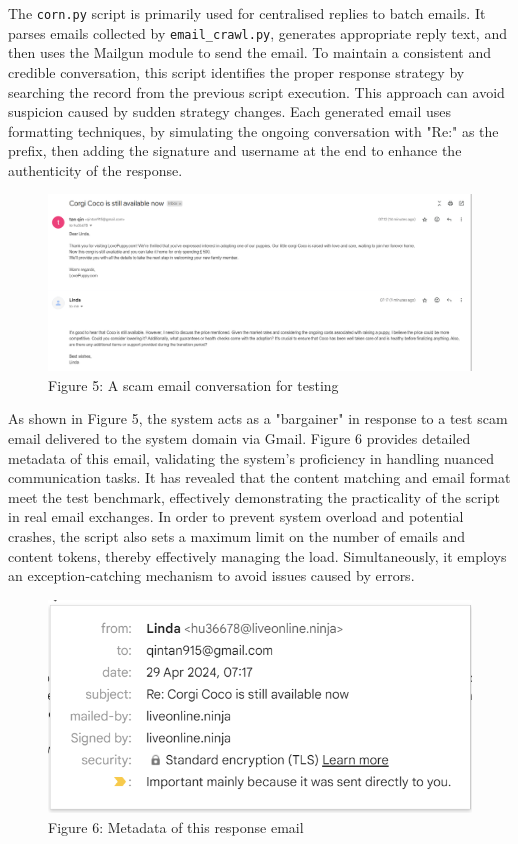 \documentclass[ oneside,%
                    author={Cassie Qing Tang},
                    degree={BSc},
                     title={An Automated Response System for Disrupting Online Pet Scamming \\ },
                    subtitle={ }]{dissertation}
\begin{document}
The \texttt{corn.py} script is primarily used for centralised replies to batch emails. It parses emails collected by \texttt{email\_crawl.py}, generates appropriate reply text, and then uses the Mailgun module to send the email. To maintain a consistent and credible conversation, this script identifies the proper response strategy by searching the record from the previous script execution. This approach can avoid suspicion caused by sudden strategy changes. Each generated email uses formatting techniques, by simulating the ongoing conversation with "Re:" as the prefix, then adding the signature and username at the end to enhance the authenticity of the response.
\begin{figure}[H]
\centering
\includegraphics[width=\linewidth, height=0.25\textheight]{pic/figure5.png}
\caption{Figure 5: A scam email conversation for testing}
\label{fig:pic5}
\end{figure}

As shown in Figure 5, the system acts as a "bargainer" in response to a test scam email delivered to the system domain via Gmail. Figure 6 provides detailed metadata of this email, validating the system's proficiency in handling nuanced communication tasks. It has revealed that the content matching and email format meet the test benchmark, effectively demonstrating the practicality of the script in real email exchanges. In order to prevent system overload and potential crashes, the script also sets a maximum limit on the number of emails and content tokens, thereby effectively managing the load. Simultaneously, it employs an exception-catching mechanism to avoid issues caused by errors.
\begin{figure}[H]
\centering
\includegraphics[width=0.4\linewidth]{pic/figure6.png}
\caption{Figure 6: Metadata of this response email}
\label{fig:pic6}
\end{figure}
\end{document}
